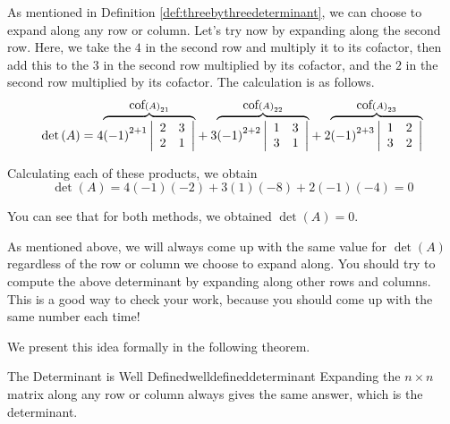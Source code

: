 \begin{solution}
As mentioned in Definition \ref{def:threebythreedeterminant}, we can choose to 
expand along any row or column. Let's try now by expanding along the second row.
Here, we take the $4$ in the second row and multiply it to its cofactor, then 
add this to the $3$ in the second row multiplied by its cofactor, and the $2$ in the 
second row multiplied by its cofactor. The calculation is as follows. 
\begin{equation*}
\det \left(A\right)
=
4 \overset{\mbox{cof}\left( A\right) _{21}}{\overbrace{\left( -1\right)
^{2+1}\left|
\begin{array}{rr}
2 & 3 \\
2 & 1
\end{array}
\right| }}+3 \overset{\mbox{cof}\left( A\right) _{22}}{\overbrace{\left(
-1\right) ^{2+2}\left|
\begin{array}{rr}
1 & 3 \\
3 & 1
\end{array}
\right| }}+2 \overset{\mbox{cof}\left( A\right) _{23}}{\overbrace{\left(
-1\right) ^{2+3}\left|
\begin{array}{rr}
1 & 2 \\
3 & 2
\end{array}
\right| }}
\end{equation*}

Calculating each of these products, we obtain
\begin{equation*}
\det \left(A\right)
=
4\left(-1\right)\left(-2\right) 
+
3\left(1\right)\left(-8\right) 
+
2 \left(-1\right)\left(-4\right)
=
0
\end{equation*}

You can see that for both methods, we obtained $\det \left(A\right) = 0$. 
\end{solution}

As mentioned above, we will always come up with the same value for $\det \left(A\right)$ regardless of the row or column 
we choose to expand along. You should try to compute the above determinant by expanding along other
rows and columns. This is a good way to check your work, because you should come up 
with the same number each time!  

We present this idea formally in the following theorem.

\begin{theorem}{The Determinant is Well Defined}{welldefineddeterminant}
Expanding the $n\times n$ matrix along any row or column always gives the
same answer, which is the determinant.
\end{theorem}

